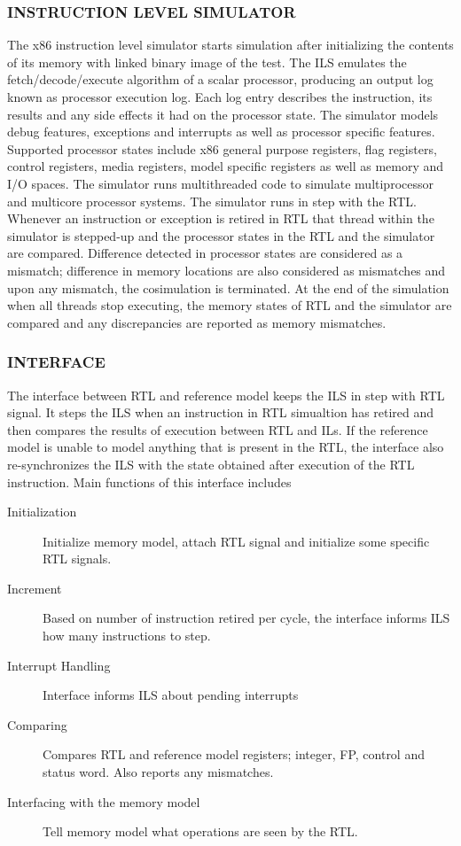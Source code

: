 \subsubsection {INSTRUCTION LEVEL SIMULATOR}
The x86 instruction level simulator starts simulation after initializing the contents of its memory with linked binary image of the test. The ILS emulates the fetch/decode/execute algorithm of a scalar processor, producing an output log known as processor execution log. Each log entry describes the instruction, its results and any side effects it had on the processor state. The simulator models debug features, exceptions and interrupts as well as processor specific features. Supported processor states include x86 general purpose registers, flag registers, control registers, media registers, model specific registers as well as memory and I/O spaces. The simulator runs multithreaded code to simulate multiprocessor and multicore processor systems. 
The simulator runs in step with the RTL. Whenever an instruction or exception is retired in RTL that thread within the simulator is stepped-up and the processor states in the RTL and the simulator are compared. Difference detected in processor states are considered as a mismatch; difference in memory locations are also considered as mismatches and upon any mismatch, the cosimulation is terminated. At the end of the simulation when all threads stop executing, the memory states of RTL and the simulator are compared and any discrepancies are reported as memory mismatches.

\subsubsection {INTERFACE}
The interface between RTL and reference model keeps the ILS in step with RTL signal. It steps the ILS when an instruction in RTL simualtion has retired and then compares the results of execution between RTL and ILs. If the reference model is unable to model anything that is present in the RTL, the interface also re-synchronizes the ILS with the state obtained after execution of the RTL instruction.
Main functions of this interface includes
\begin{description}
	\item[Initialization] Initialize memory model, attach RTL signal and initialize some specific RTL signals.
	\item[Increment] Based on number of instruction retired per cycle, the interface informs ILS how many instructions to step.
	\item[Interrupt Handling] Interface informs ILS about pending interrupts
	\item[Comparing] Compares RTL and reference model registers; integer, FP, control and status word. Also reports any mismatches.
	\item[Interfacing with the memory model] Tell memory model what operations are seen by the RTL. 
\end{description}

